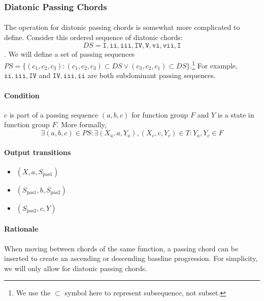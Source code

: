 \documentclass[]{article}
\begin{document}
\subsubsection{Diatonic Passing Chords}
\paragraph{} The operation for diatonic passing chords is somewhat more complicated to define.  Consider this ordered sequence of diatonic chords: $$DS = \texttt{I}, \texttt{ii}, \texttt{iii}, \texttt{IV}, \texttt{V}, \texttt{vi}, \texttt{vii}, \texttt{I}$$.  We will define a set of passing sequences $PS = \{(c_1, c_2, c_3) : (c_1, c_2, c_3) \subset DS \vee (c_3, c_2, c_1) \subset DS \}$.\footnote{We use the $\subset$ symbol here to represent subsequence, not subset.}  For example, $\texttt{ii}, \texttt{iii}, \texttt{IV}$ and $\texttt{IV}, \texttt{iii}, \texttt{ii}$ are both subdominant passing sequences.

\paragraph{Condition} $c$ is part of a passing sequence $(a, b, c)$ for function group $F$ and $Y$ is a state in function group $F$.  More formally, $$\exists (a, b, c) \in PS : \exists (X_a, a, Y_a), (X_c, c, Y_c) \in T : Y_a, Y_c \in F$$

\paragraph{Output transitions}
\begin{itemize}
	\item $(X, a, S_\textrm{pas1})$
	\item $(S_\textrm{pas1}, b, S_\textrm{pas2})$
	\item $(S_\textrm{pas2}, c, Y)$
\end{itemize}

\paragraph{Rationale} When moving between chords of the same function, a passing chord can be inserted to create an ascending or descending bassline progression.  For simplicity, we will only allow for diatonic passing chords.
\end{document}
